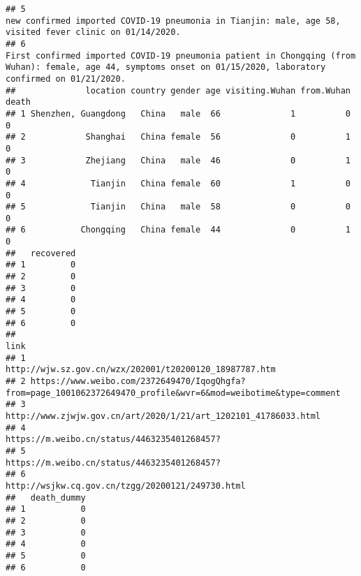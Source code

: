 \documentclass[
]{article}
\begin{document}
\begin{verbatim}
## 5                                                                                                                                                                                                                                                                                                              new confirmed imported COVID-19 pneumonia in Tianjin: male, age 58, visited fever clinic on 01/14/2020.
## 6                                                                                                                                                                                                                                                     First confirmed imported COVID-19 pneumonia patient in Chongqing (from Wuhan): female, age 44, symptoms onset on 01/15/2020, laboratory confirmed on 01/21/2020.
##              location country gender age visiting.Wuhan from.Wuhan death
## 1 Shenzhen, Guangdong   China   male  66              1          0     0
## 2            Shanghai   China female  56              0          1     0
## 3            Zhejiang   China   male  46              0          1     0
## 4             Tianjin   China female  60              1          0     0
## 5             Tianjin   China   male  58              0          0     0
## 6           Chongqing   China female  44              0          1     0
##   recovered
## 1         0
## 2         0
## 3         0
## 4         0
## 5         0
## 6         0
##                                                                                                             link
## 1                                                         http://wjw.sz.gov.cn/wzx/202001/t20200120_18987787.htm
## 2 https://www.weibo.com/2372649470/IqogQhgfa?from=page_1001062372649470_profile&wvr=6&mod=weibotime&type=comment
## 3                                                http://www.zjwjw.gov.cn/art/2020/1/21/art_1202101_41786033.html
## 4                                                                    https://m.weibo.cn/status/4463235401268457?
## 5                                                                    https://m.weibo.cn/status/4463235401268457?
## 6                                                               http://wsjkw.cq.gov.cn/tzgg/20200121/249730.html
##   death_dummy
## 1           0
## 2           0
## 3           0
## 4           0
## 5           0
## 6           0
\end{verbatim}
\end{document}
